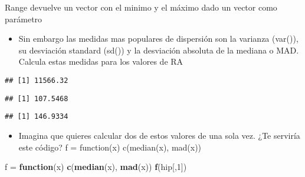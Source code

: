 \documentclass[]{article}
\newenvironment{Shaded}{\begin{snugshade}}{\end{snugshade}}
\newcommand{\KeywordTok}[1]{\textcolor[rgb]{0.13,0.29,0.53}{\textbf{#1}}}
\newcommand{\DecValTok}[1]{\textcolor[rgb]{0.00,0.00,0.81}{#1}}
\newcommand{\StringTok}[1]{\textcolor[rgb]{0.31,0.60,0.02}{#1}}
\newcommand{\ControlFlowTok}[1]{\textcolor[rgb]{0.13,0.29,0.53}{\textbf{#1}}}
\newcommand{\OperatorTok}[1]{\textcolor[rgb]{0.81,0.36,0.00}{\textbf{#1}}}
\newcommand{\NormalTok}[1]{#1}
\providecommand{\tightlist}{%
  \setlength{\itemsep}{0pt}\setlength{\parskip}{0pt}}
\begin{document}
Range devuelve un vector con el minimo y el máximo dado un vector como
parámetro

\begin{itemize}
\tightlist
\item
  Sin embargo las medidas mas populares de dispersión son la varianza
  (var()), su desviación standard (sd()) y la desviación absoluta de la
  mediana o MAD. Calcula estas medidas para los valores de RA
\end{itemize}

\begin{Shaded}
\end{Shaded}

\begin{verbatim}
## [1] 11566.32
\end{verbatim}

\begin{Shaded}
\end{Shaded}

\begin{verbatim}
## [1] 107.5468
\end{verbatim}

\begin{Shaded}
\end{Shaded}

\begin{verbatim}
## [1] 146.9334
\end{verbatim}

\begin{itemize}
\tightlist
\item
  Imagina que quieres calcular dos de estos valores de una sola vez. ¿Te
  serviría este código? f = function(x) c(median(x), mad(x))
\end{itemize}

\begin{Shaded}
\begin{Highlighting}[]
\NormalTok{f =}\StringTok{ }\ControlFlowTok{function}\NormalTok{(x) }\KeywordTok{c}\NormalTok{(}\KeywordTok{median}\NormalTok{(x), }\KeywordTok{mad}\NormalTok{(x))  }
\KeywordTok{f}\NormalTok{(hip[,}\DecValTok{1}\NormalTok{])}
\end{Highlighting}
\end{Shaded}
\end{document}
